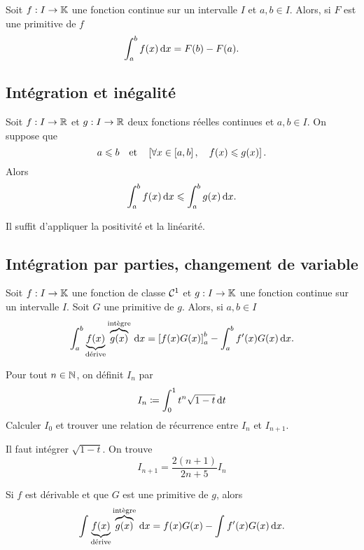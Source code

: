 \documentclass{magnoliaold}
\begin{document}
\begin{theoreme}[utile=3, nom=Théorème fondamental de l'analyse]
  Soit $f:I\to\mathbb{K}$ une fonction continue sur un intervalle $I$ et $a,b\in I$. Alors, si
  $F$ est une primitive de $f$
  \[\int_{a}^{b} f(x)\,\text{d}x=F(b)-F(a).\]
\end{theoreme}

\subsection{Intégration et inégalité}

\begin{proposition}[utile=3]
Soit $f:I\to\mathbb{R}$ et $g:I\to\mathbb{R}$ deux fonctions réelles continues et $a,b\in I$. On suppose que
\[a\leqslant b \quad\text{et}\quad \left[\forall x\in\left[a,b\right] ,\quad f(x)\leqslant g(x)\right].\]
Alors
\[\int_{a}^{b} f(x)\,\text{d}x\leqslant\int_{a}^{b} g(x)\,\text{d}x.\]
\end{proposition}

\begin{preuve}
Il suffit d'appliquer la positivité et la linéarité.
\end{preuve}


\subsection{Intégration par parties, changement de variable}

\begin{proposition}[utile=3, nom=Intégration par parties]
Soit $f:I\to\mathbb{K}$ une fonction de classe $\mathcal{C}^{1}$ et $g:I\to\mathbb{K}$ une fonction
continue sur un intervalle $I$. Soit $G$ une primitive de $g$. Alors, si $a,b\in I$
\[\int_{a}^{b} \underbrace{f(x)}_{\text{d\'erive}} \overbrace{g(x)}^{\text{int\`egre}}\,\text{d}x=\left[ f(x)G(x) \right]_{a}^{b}-
  \int_{a}^{b} f'(x)G(x)\,\text{d}x.\]
\end{proposition}

\begin{exoUnique}
\exo Pour tout $n\in\mathbb{N}$, on définit $I_n$ par
  \[I_n\coloneqq\int_{0}^{1} t^n\sqrt{1-t}\,\text{d}t\]
  Calculer $I_0$ et trouver une relation de récurrence entre $I_n$ et $I_{n+1}$.
  \begin{sol}
  Il faut intégrer $\sqrt{1-t}$. On trouve
  \[I_{n+1}=\frac{2(n+1)}{2n+5}I_n\]
  \end{sol}
\end{exoUnique}

\begin{remarqueUnique}
\remarque Si $f$ est dérivable et que $G$ est une primitive de $g$, alors
  \[\int_{}^{} \underbrace{f(x)}_{\text{d\'erive}} \overbrace{g(x)}^{\text{int\`egre}}\,\text{d}x=f(x)G(x)-\int_{}^{} f'(x)G(x)\,\text{d}x.\]
\end{remarqueUnique}
\end{document}
